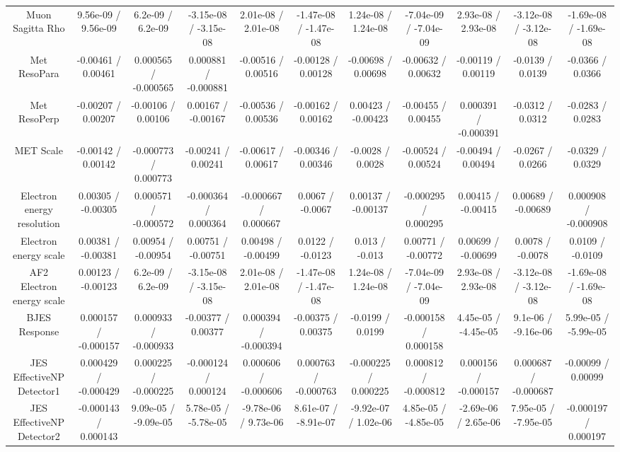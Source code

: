 \begin{table}[htbp]
\begin{center}
\begin{tabular}{|c|c|c|c|c|c|c|c|c|c|c|}
  Muon Sagitta Rho & 9.56e-09 / 9.56e-09 & 6.2e-09 / 6.2e-09 & -3.15e-08 / -3.15e-08 & 2.01e-08 / 2.01e-08 & -1.47e-08 / -1.47e-08 & 1.24e-08 / 1.24e-08 & -7.04e-09 / -7.04e-09 & 2.93e-08 / 2.93e-08 & -3.12e-08 / -3.12e-08 & -1.69e-08 / -1.69e-08 \\ 
  Met ResoPara & -0.00461 / 0.00461 & 0.000565 / -0.000565 & 0.000881 / -0.000881 & -0.00516 / 0.00516 & -0.00128 / 0.00128 & -0.00698 / 0.00698 & -0.00632 / 0.00632 & -0.00119 / 0.00119 & -0.0139 / 0.0139 & -0.0366 / 0.0366 \\ 
  Met ResoPerp & -0.00207 / 0.00207 & -0.00106 / 0.00106 & 0.00167 / -0.00167 & -0.00536 / 0.00536 & -0.00162 / 0.00162 & 0.00423 / -0.00423 & -0.00455 / 0.00455 & 0.000391 / -0.000391 & -0.0312 / 0.0312 & -0.0283 / 0.0283 \\ 
  MET Scale & -0.00142 / 0.00142 & -0.000773 / 0.000773 & -0.00241 / 0.00241 & -0.00617 / 0.00617 & -0.00346 / 0.00346 & -0.0028 / 0.0028 & -0.00524 / 0.00524 & -0.00494 / 0.00494 & -0.0267 / 0.0266 & -0.0329 / 0.0329 \\ 
  Electron energy resolution & 0.00305 / -0.00305 & 0.000571 / -0.000572 & -0.000364 / 0.000364 & -0.000667 / 0.000667 & 0.0067 / -0.0067 & 0.00137 / -0.00137 & -0.000295 / 0.000295 & 0.00415 / -0.00415 & 0.00689 / -0.00689 & 0.000908 / -0.000908 \\ 
  Electron energy scale & 0.00381 / -0.00381 & 0.00954 / -0.00954 & 0.00751 / -0.00751 & 0.00498 / -0.00499 & 0.0122 / -0.0123 & 0.013 / -0.013 & 0.00771 / -0.00772 & 0.00699 / -0.00699 & 0.0078 / -0.0078 & 0.0109 / -0.0109 \\ 
  AF2 Electron energy scale & 0.00123 / -0.00123 & 6.2e-09 / 6.2e-09 & -3.15e-08 / -3.15e-08 & 2.01e-08 / 2.01e-08 & -1.47e-08 / -1.47e-08 & 1.24e-08 / 1.24e-08 & -7.04e-09 / -7.04e-09 & 2.93e-08 / 2.93e-08 & -3.12e-08 / -3.12e-08 & -1.69e-08 / -1.69e-08 \\ 
  BJES Response & 0.000157 / -0.000157 & 0.000933 / -0.000933 & -0.00377 / 0.00377 & 0.000394 / -0.000394 & -0.00375 / 0.00375 & -0.0199 / 0.0199 & -0.000158 / 0.000158 & 4.45e-05 / -4.45e-05 & 9.1e-06 / -9.16e-06 & 5.99e-05 / -5.99e-05 \\ 
  JES EffectiveNP Detector1 & 0.000429 / -0.000429 & 0.000225 / -0.000225 & -0.000124 / 0.000124 & 0.000606 / -0.000606 & 0.000763 / -0.000763 & -0.000225 / 0.000225 & 0.000812 / -0.000812 & 0.000156 / -0.000157 & 0.000687 / -0.000687 & -0.00099 / 0.00099 \\ 
  JES EffectiveNP Detector2 & -0.000143 / 0.000143 & 9.09e-05 / -9.09e-05 & 5.78e-05 / -5.78e-05 & -9.78e-06 / 9.73e-06 & 8.61e-07 / -8.91e-07 & -9.92e-07 / 1.02e-06 & 4.85e-05 / -4.85e-05 & -2.69e-06 / 2.65e-06 & 7.95e-05 / -7.95e-05 & -0.000197 / 0.000197 \\ 

\end{tabular}
\end{center}
\end{table}
